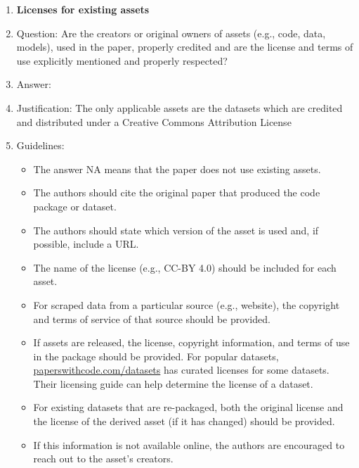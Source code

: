 \documentclass[letterpaper]{article}
\begin{document}
\begin{enumerate}
\item {\bf Licenses for existing assets}
    \item[] Question: Are the creators or original owners of assets (e.g., code, data, models), used in the paper, properly credited and are the license and terms of use explicitly mentioned and properly respected?
    \item[] Answer: \answerYes{} %
    \item[] Justification: The only applicable assets are the datasets which are credited and distributed under a Creative Commons Attribution License
    \item[] Guidelines:
    \begin{itemize}
        \item The answer NA means that the paper does not use existing assets.
        \item The authors should cite the original paper that produced the code package or dataset.
        \item The authors should state which version of the asset is used and, if possible, include a URL.
        \item The name of the license (e.g., CC-BY 4.0) should be included for each asset.
        \item For scraped data from a particular source (e.g., website), the copyright and terms of service of that source should be provided.
        \item If assets are released, the license, copyright information, and terms of use in the package should be provided. For popular datasets, \url{paperswithcode.com/datasets} has curated licenses for some datasets. Their licensing guide can help determine the license of a dataset.
        \item For existing datasets that are re-packaged, both the original license and the license of the derived asset (if it has changed) should be provided.
        \item If this information is not available online, the authors are encouraged to reach out to the asset's creators.
    \end{itemize}


\end{enumerate}
\end{document}
